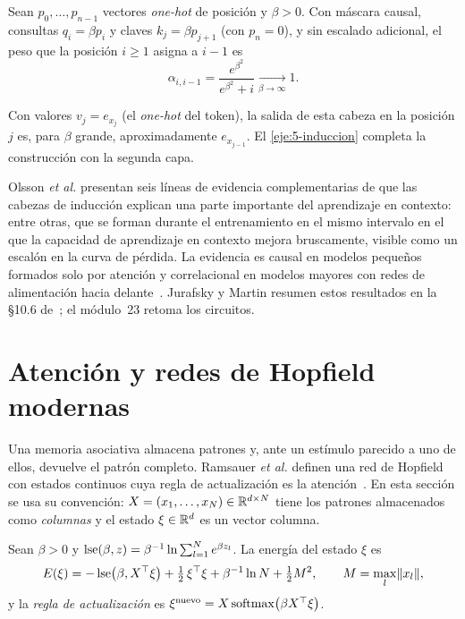\addtocounter{figure}{1}%

\begin{teorema}\label{teo:previo}
Sean $p_0,\dots,p_{n-1}$ vectores \emph{one-hot} de posición y $\beta>0$. Con máscara causal, consultas $q_i=\beta p_i$ y claves $k_j=\beta p_{j+1}$ (con $p_n=0$), y sin escalado adicional, el peso que la posición $i\ge 1$ asigna a $i-1$ es
\[
\alpha_{i,i-1}=\frac{e^{\beta^{2}}}{e^{\beta^{2}}+i}\xrightarrow[\beta\to\infty]{}1 .
\]
\end{teorema}

Con valores $v_j=e_{x_j}$ (el \emph{one-hot} del token), la salida de esta cabeza en la posición $j$ es, para $\beta$ grande, aproximadamente $e_{x_{j-1}}$. El \cref{eje:5-induccion} completa la construcción con la segunda capa.

\begin{observacion}
Olsson \emph{et al.} presentan seis líneas de evidencia complementarias de que las cabezas de inducción explican una parte importante del aprendizaje en contexto: entre otras, que se forman durante el entrenamiento en el mismo intervalo en el que la capacidad de aprendizaje en contexto mejora bruscamente, visible como un escalón en la curva de pérdida. La evidencia es causal en modelos pequeños formados solo por atención y correlacional en modelos mayores con redes de alimentación hacia delante~\cite{olsson}. Jurafsky y Martin resumen estos resultados en la §10.6 de~\cite{jm3}; el módulo~23 retoma los circuitos.
\end{observacion}

\section{Atención y redes de Hopfield modernas}

Una memoria asociativa almacena patrones y, ante un estímulo parecido a uno de ellos, devuelve el patrón completo. Ramsauer \emph{et al.} definen una red de Hopfield con estados continuos cuya regla de actualización es la atención~\cite[§2]{ramsauer}. En esta sección se usa su convención: $X=(x_1,\dots,x_N)\in\mathbb{R}^{d\times N}$ tiene los patrones almacenados como \emph{columnas} y el estado $\xi\in\mathbb{R}^{d}$ es un vector columna.

\begin{definicion}\label{def:hopfield}
Sean $\beta>0$ y $\operatorname{lse}(\beta,z)=\beta^{-1}\ln\sum_{l=1}^{N}e^{\beta z_l}$. La energía del estado $\xi$ es
\[
E(\xi)=-\operatorname{lse}\bigl(\beta,X^{\top}\xi\bigr)+\tfrac12\,\xi^{\top}\xi+\beta^{-1}\ln N+\tfrac12M^{2},\qquad M=\max_l\lVert x_l\rVert,
\]
y la \emph{regla de actualización} es $\xi^{\text{nuevo}}=X\operatorname{softmax}\bigl(\beta X^{\top}\xi\bigr)$.
\end{definicion}

